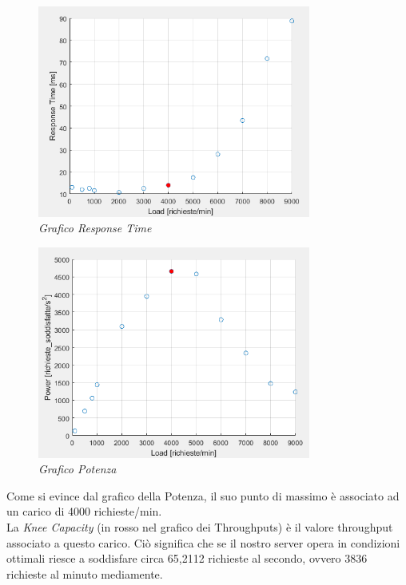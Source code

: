\begin{figure}[H]
	\centering
	\includegraphics[width=0.8\textwidth]{img/hw2/ResponseTime.png}
	\caption{\textit{Grafico Response Time}}
\end{figure}

\begin{figure}[H]
	\centering
	\includegraphics[width=0.8\textwidth]{img/hw2/Potenza.png}
	\caption{\textit{Grafico Potenza}}
\end{figure}
\newpage

Come si evince dal grafico della Potenza, il suo punto di massimo è associato ad un carico di 4000 richieste/min. 
\\
La \textit{Knee Capacity} (in rosso nel grafico dei Throughputs) è il valore throughput associato a questo carico. Ciò significa che se il nostro server opera in condizioni ottimali riesce a soddisfare circa 65,2112 richieste al secondo, ovvero 3836 richieste al minuto mediamente.
\\

